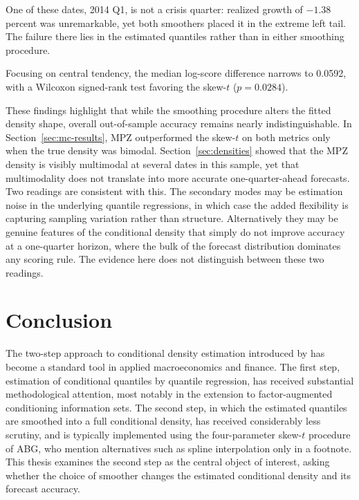 \documentclass[12pt]{report} %
\begin{document}
One of these dates, 2014 Q1, is not a crisis quarter: realized growth of $-1.38$ percent was unremarkable, yet both smoothers placed it in the extreme left tail. The failure there lies in the estimated quantiles rather than in either smoothing procedure.

Focusing on central tendency, the median log-score difference narrows to 0.0592, with a Wilcoxon signed-rank test favoring the skew-$t$ ($p = 0.0284$).

These findings highlight that while the smoothing procedure alters the fitted density shape, overall out-of-sample accuracy remains nearly indistinguishable. In Section~\ref{sec:mc-results}, MPZ outperformed the skew-$t$ on both metrics only when the true density was bimodal. Section~\ref{sec:densities} showed that the MPZ density is visibly multimodal at several dates in this sample, yet that multimodality does not translate into more accurate one-quarter-ahead forecasts. Two readings are consistent with this. The secondary modes may be estimation noise in the underlying quantile regressions, in which case the added flexibility is capturing sampling variation rather than structure. Alternatively they may be genuine features of the conditional density that simply do not improve accuracy at a one-quarter horizon, where the bulk of the forecast distribution dominates any scoring rule. The evidence here does not distinguish between these two readings.


\chapter{Conclusion}
\label{ch:conclusion}

The two-step approach to conditional density estimation introduced by \textcite{adrian2019vulnerable} has become a standard tool in applied macroeconomics and finance. The first step, estimation of conditional quantiles by quantile regression, has received substantial methodological attention, most notably in the extension to factor-augmented conditioning information sets. The second step, in which the estimated quantiles are smoothed into a full conditional density, has received considerably less scrutiny, and is typically implemented using the four-parameter skew-$t$ procedure of ABG, who mention alternatives such as spline interpolation only in a footnote. This thesis examines the second step as the central object of interest, asking whether the choice of smoother changes the estimated conditional density and its forecast accuracy.
\end{document}

